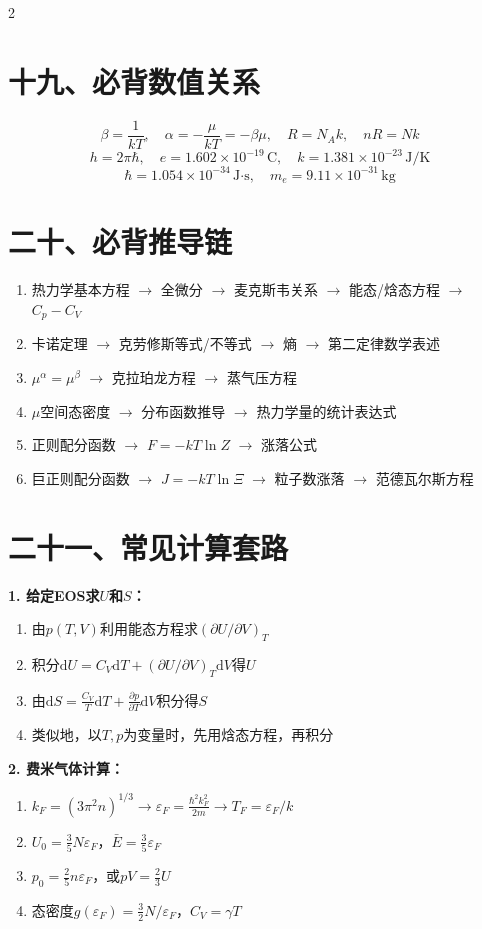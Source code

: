 \documentclass[10pt,a4paper,fontset=mac]{ctexart}
\newcommand{\dd}{\mathrm{d}}
\newcommand{\đ}{\mathrm{đ}}
\begin{document}
\begin{multicols}{2}
\section*{十九、必背数值关系}

\[
\boxed{\beta=\frac{1}{kT}},\quad
\boxed{\alpha=-\frac{\mu}{kT}=-\beta\mu},\quad
R=N_Ak,\quad nR=Nk
\]
\[
h=2\pi\hbar,\quad e=1.602\times10^{-19}\,\text{C},\quad k=1.381\times10^{-23}\,\text{J/K}
\]
\[
\hbar=1.054\times10^{-34}\,\text{J·s},\quad m_e=9.11\times10^{-31}\,\text{kg}
\]

\section*{二十、必背推导链}

\begin{enumerate}
\item 热力学基本方程 $\to$ 全微分 $\to$ 麦克斯韦关系 $\to$ 能态/焓态方程 $\to$ $C_p-C_V$
\item 卡诺定理 $\to$ 克劳修斯等式/不等式 $\to$ 熵 $\to$ 第二定律数学表述
\item $\mu^\alpha=\mu^\beta$ $\to$ 克拉珀龙方程 $\to$ 蒸气压方程
\item $\mu$空间态密度 $\to$ 分布函数推导 $\to$ 热力学量的统计表达式
\item 正则配分函数 $\to$ $F=-kT\ln Z$ $\to$ 涨落公式
\item 巨正则配分函数 $\to$ $J=-kT\ln\Xi$ $\to$ 粒子数涨落 $\to$ 范德瓦尔斯方程
\end{enumerate}

\section*{二十一、常见计算套路}

\textbf{1. 给定EOS求$U$和$S$：}
\begin{enumerate}
\item 由$p(T,V)$利用能态方程求$(\partial U/\partial V)_T$
\item 积分$\dd U=C_V\dd T+(\partial U/\partial V)_T\dd V$得$U$
\item 由$\dd S=\frac{C_V}{T}\dd T+\frac{\partial p}{\partial T}\dd V$积分得$S$
\item 类似地，以$T,p$为变量时，先用焓态方程，再积分
\end{enumerate}

\textbf{2. 费米气体计算：}
\begin{enumerate}
\item $k_F=(3\pi^2n)^{1/3}\to\varepsilon_F=\frac{\hbar^2k_F^2}{2m}\to T_F=\varepsilon_F/k$
\item $U_0=\frac{3}{5}N\varepsilon_F$，$\bar{E}=\frac{3}{5}\varepsilon_F$
\item $p_0=\frac{2}{5}n\varepsilon_F$，或$pV=\frac{2}{3}U$
\item 态密度$g(\varepsilon_F)=\frac{3}{2}N/\varepsilon_F$，$C_V=\gamma T$
\end{enumerate}


\end{multicols}
\end{document}
